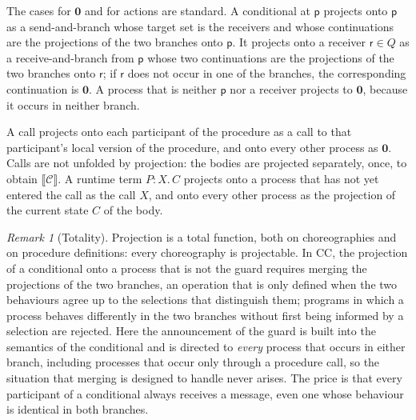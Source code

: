 \documentclass[11pt]{article}
\theoremstyle{plain}
\theoremstyle{definition}
\theoremstyle{remark}
\newtheorem{remark}[theorem]{Remark}
\newcommand{\nil}{\mathbf{0}}
\newcommand{\pp}{\mathsf{p}}
\newcommand{\rr}{\mathsf{r}}
\newcommand{\projn}[1]{\llbracket #1 \rrbracket}
\newcommand{\Defs}{\mathcal{C}}
\newcommand{\rt}[3]{#1\mathbin{:}#2.\,#3}
\begin{document}
The cases for $\nil$ and for actions are standard.  A conditional at $\pp$
projects onto $\pp$ as a send-and-branch whose target set is the receivers and
whose continuations are the projections of the two branches onto $\pp$.  It
projects onto a receiver $\rr\in Q$ as a receive-and-branch from $\pp$ whose
two continuations are the projections of the two branches onto $\rr$; if $\rr$
does not occur in one of the branches, the corresponding continuation is
$\nil$.  A process that is neither $\pp$ nor a receiver projects to $\nil$,
because it occurs in neither branch.

A call projects onto each participant of the procedure as a call to that
participant's local version of the procedure, and onto every other process as
$\nil$.  Calls are not unfolded by projection: the bodies are projected
separately, once, to obtain $\projn{\Defs}$.  A runtime term $\rt{P}{X}{C}$
projects onto a process that has not yet entered the call as the call $X$,
and onto every other process as the projection of the current state $C$ of
the body.

\begin{remark}[Totality]\label{rem:total}
  Projection is a total function, both on choreographies and on procedure
  definitions: every choreography is projectable.  In CC, the projection of a
  conditional onto a process that is not the guard requires merging the
  projections of the two branches, an operation that is only defined when the
  two behaviours agree up to the selections that distinguish them; programs
  in which a process behaves differently in the two branches without first
  being informed by a selection are rejected.  Here the announcement of the
  guard is built into the semantics of the conditional and is directed to
  \emph{every} process that occurs in either branch, including processes
  that occur only through a procedure call, so the situation that merging is
  designed to handle never arises.  The price is that every participant of a
  conditional always receives a message, even one whose behaviour is
  identical in both branches.
\end{remark}
\end{document}
